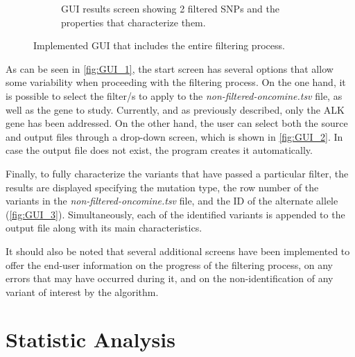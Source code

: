 \begin{figure}[ht]
\begin{subfigure}{0.52\textwidth}
        \caption{GUI results screen showing 2 filtered SNPs and the properties that characterize them.}
        \label{fig:GUI_3}
    \end{subfigure}
    \hfill
    \caption{Implemented GUI that includes the entire filtering process.}
    \label{fig:GUI}
\end{figure}

As can be seen in \autoref{fig:GUI_1}, the start screen has several options that allow some variability when proceeding with the filtering process. On the one hand, it is possible to select the filter\slash s to apply to the \textit{non-filtered-oncomine.tsv} file, as well as the gene to study. Currently, and as previously described, only the ALK gene has been addressed. On the other hand, the user can select both the source and output files through a drop-down screen, which is shown in \autoref{fig:GUI_2}. In case the output file does not exist, the program creates it automatically.

Finally, to fully characterize the variants that have passed a particular filter, the results are displayed specifying the mutation type, the row number of the variants in the \textit{non-filtered-oncomine.tsv} file, and the ID of the alternate allele (\autoref{fig:GUI_3}). Simultaneously, each of the identified variants is appended to the output file along with its main characteristics.

It should also be noted that several additional screens have been implemented to offer the end-user information on the progress of the filtering process, on any errors that may have occurred during it, and on the non-identification of any variant of interest by the algorithm.

\section{Statistic Analysis}

